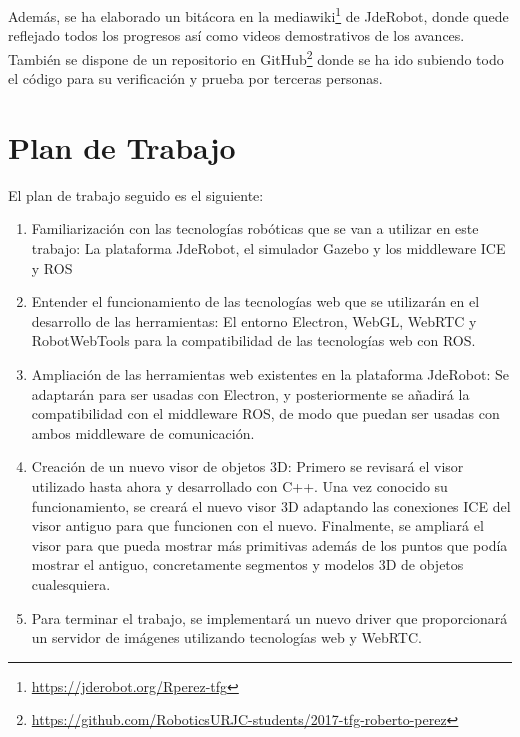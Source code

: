 Además, se ha elaborado un bitácora en la mediawiki\footnote{\url{https://jderobot.org/Rperez-tfg}} de JdeRobot, donde quede reflejado todos los progresos así como videos demostrativos de los avances. También se dispone de un repositorio en GitHub\footnote{\url{https://github.com/RoboticsURJC-students/2017-tfg-roberto-perez}} donde se ha ido subiendo todo el código para su verificación y prueba por terceras personas.

\section{Plan de Trabajo}
El plan de trabajo seguido es el siguiente:

\begin{enumerate}
\item Familiarización con las tecnologías robóticas que se van a utilizar en este trabajo: La plataforma JdeRobot, el simulador Gazebo y los middleware ICE y ROS
\item Entender el funcionamiento de las tecnologías web que se utilizarán en el desarrollo de las herramientas: El entorno Electron, WebGL, WebRTC y RobotWebTools para la compatibilidad de las tecnologías web con ROS.
\item Ampliación de las herramientas web existentes en la plataforma JdeRobot: Se adaptarán para ser usadas con Electron, y posteriormente se añadirá la compatibilidad con el middleware ROS, de modo que puedan ser usadas con ambos middleware de comunicación.
\item Creación de un nuevo visor de objetos 3D: Primero se revisará el visor utilizado hasta ahora y desarrollado con C++. Una vez conocido su funcionamiento, se creará el nuevo visor 3D adaptando las conexiones ICE del visor antiguo para que funcionen con el nuevo. Finalmente, se ampliará el visor para que pueda mostrar más primitivas además de los puntos que podía mostrar el antiguo, concretamente segmentos y modelos 3D de objetos cualesquiera.
\item Para terminar el trabajo, se implementará un nuevo driver que proporcionará un servidor de imágenes utilizando tecnologías web y WebRTC.
\end{enumerate}


